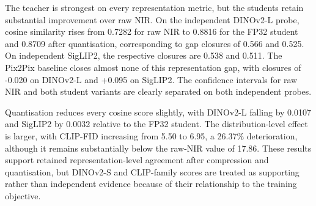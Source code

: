 \begin{table}[!htbp]
\centering
\scriptsize
\setlength{\tabcolsep}{2.5pt}
\caption{Embedding agreement with native RGB. Cosine rows report per-image means with 95\% image-bootstrap confidence intervals. ``Partial'' shows evaluator-family overlap rather than reuse of the exact test-time weights.}
\label{tab:res_pixel_embedding}
\end{table}

The teacher is strongest on every representation metric, but the students retain substantial improvement over raw NIR. On the independent DINOv2-L probe, cosine similarity rises from 0.7282 for raw NIR to 0.8816 for the FP32 student and 0.8709 after quantisation, corresponding to gap closures of 0.566 and 0.525. On independent SigLIP2, the respective closures are 0.538 and 0.511. The Pix2Pix baseline closes almost none of this representation gap, with closures of -0.020 on DINOv2-L and +0.095 on SigLIP2. The confidence intervals for raw NIR and both student variants are clearly separated on both independent probes.

Quantisation reduces every cosine score slightly, with DINOv2-L falling by 0.0107 and SigLIP2 by 0.0032 relative to the FP32 student. The distribution-level effect is larger, with CLIP-FID increasing from 5.50 to 6.95, a 26.37\% deterioration, although it remains substantially below the raw-NIR value of 17.86. These results support retained representation-level agreement after compression and quantisation, but DINOv2-S and CLIP-family scores are treated as supporting rather than independent evidence because of their relationship to the training objective.

